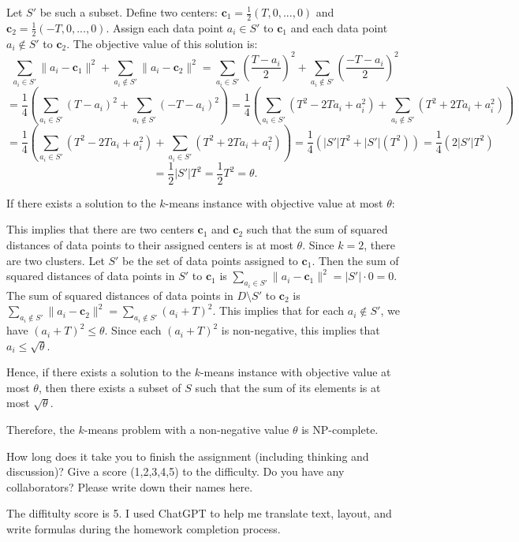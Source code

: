 \documentclass{oxmathproblems}
\begin{document}
\begin{questions}
Let $S'$ be such a subset. Define two centers: $\mathbf{c}_1 = \frac{1}{2}(T, 0, ..., 0)$ and $\mathbf{c}_2 = \frac{1}{2}(-T, 0, ..., 0)$. Assign each data point $a_i \in S'$ to $\mathbf{c}_1$ and each data point $a_i \notin S'$ to $\mathbf{c}_2$. The objective value of this solution is:
\[
\sum_{a_i \in S'} \|a_i - \mathbf{c}_1\|^2 + \sum_{a_i \notin S'} \|a_i - \mathbf{c}_2\|^2 = \sum_{a_i \in S'} \left(\frac{T - a_i}{2}\right)^2 + \sum_{a_i \notin S'} \left(\frac{-T - a_i}{2}\right)^2
\]
\[= \frac{1}{4} \left(\sum_{a_i \in S'} (T - a_i)^2 + \sum_{a_i \notin S'} (-T - a_i)^2\right) = \frac{1}{4} \left(\sum_{a_i \in S'} (T^2 - 2Ta_i + a_i^2) + \sum_{a_i \notin S'} (T^2 + 2Ta_i + a_i^2)\right)\]
\[= \frac{1}{4} \left(\sum_{a_i \in S'} (T^2 - 2Ta_i + a_i^2) + \sum_{a_i \in S'} (T^2 + 2Ta_i + a_i^2)\right) = \frac{1}{4} \left(|S'|T^2 + |S'|(T^2)\right) = \frac{1}{4}(2|S'|T^2)\]
\[= \frac{1}{2}|S'|T^2 = \frac{1}{2}T^2 = \theta.\]

If there exists a solution to the $k$-means instance with objective value at most $\theta$:

This implies that there are two centers $\mathbf{c}_1$ and $\mathbf{c}_2$ such that the sum of squared distances of data points to their assigned centers is at most $\theta$. Since $k = 2$, there are two clusters. Let $S'$ be the set of data points assigned to $\mathbf{c}_1$. Then the sum of squared distances of data points in $S'$ to $\mathbf{c}_1$ is $\sum_{a_i \in S'} \|a_i - \mathbf{c}_1\|^2 = |S'| \cdot 0 = 0$. The sum of squared distances of data points in $D \setminus S'$ to $\mathbf{c}_2$ is $\sum_{a_i \notin S'} \|a_i - \mathbf{c}_2\|^2 = \sum_{a_i \notin S'} (a_i + T)^2$. This implies that for each $a_i \notin S'$, we have $(a_i + T)^2 \leq \theta$. Since each $(a_i + T)^2$ is non-negative, this implies that $a_i \leq \sqrt{\theta}$.

Hence, if there exists a solution to the $k$-means instance with objective value at most $\theta$, then there exists a subset of $S$ such that the sum of its elements is at most $\sqrt{\theta}$.

Therefore, the $k$-means problem with a non-negative value $\theta$ is NP-complete. 
  
  
\miquestion
How long does it take you to finish the assignment (including thinking and discussion)?
Give a score (1,2,3,4,5) to the difficulty.
Do you have any collaborators?
Please write down their names here.

The diffitulty score is 5. I used ChatGPT to help me translate text, layout, and write formulas during the homework completion process.

\end{questions}
\end{document}
